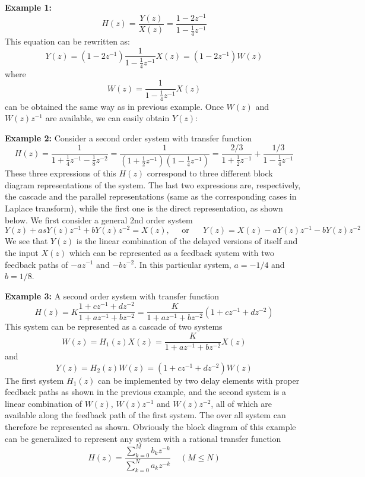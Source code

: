 
{\bf Example 1: } 
\[ H(z)=\frac{Y(z)}{X(z)}=\frac{1-2z^{-1}}{1-\frac{1}{4}z^{-1}} \]
This equation can be rewritten as:
\[ Y(z)=(1-2z^{-1}) \frac{1}{1-\frac{1}{4}z^{-1}}X(z)=(1-2z^{-1})W(z) \]
where 
\[ W(z)=\frac{1}{1-\frac{1}{4}z^{-1}}X(z) \]
can be obtained the same way as in previous example. Once $W(z)$ and
$W(z)z^{-1}$ are available, we can easily obtain $Y(z)$:


{\bf Example 2: } Consider a second order system with transfer function
\[
H(z)=\frac{1}{1+\frac{1}{4}z^{-1}-\frac{1}{8}z^{-2}}
	=\frac{1}{(1+\frac{1}{2}z^{-1})(1-\frac{1}{4}z^{-1})}
	=\frac{2/3}{1+\frac{1}{2}z^{-1}}+\frac{1/3}{1-\frac{1}{4}z^{-1}}
\]
These three expressions of this $H(z)$ correspond to three different block
diagram representations of the system. The last two expressions are, 
respectively, the cascade and the parallel representations (same as the
corresponding cases in Laplace transform), while the first one is the 
direct representation, as shown below. We first consider a general 2nd order
system
\[	Y(z)+asY(z)z^{-1}+bY(z)z^{-2}=X(z),\;\;\;\;\;\mbox{or}\;\;\;\;\;\;
	Y(z)=X(z)-aY(z)z^{-1}-bY(z)z^{-2}	\]
We see that $Y(z)$ is the linear combination of the delayed versions of 
itself and the input $X(z)$ which can be represented as a feedback system with
two feedback paths of $-az^{-1}$ and $-bz^{-2}$. In this particular system,
$a=-1/4$ and $b=1/8$.





{\bf Example 3: } A second order system with transfer function
\[	H(z)=K \frac{1+cz^{-1}+dz^{-2}}{1+az^{-1}+bz^{-2}}
	=\frac{K}{1+az^{-1}+bz^{-2}}(1+cz^{-1}+dz^{-2})
\]
This system can be represented as a cascade of two systems
\[	W(z)=H_1(z)X(z)=\frac{K}{1+az^{-1}+bz^{-2}}X(z)	\]
and 
\[	Y(z)=H_2(z)W(z)=(1+cz^{-1}+dz^{-2})W(z)	\]
The first system $H_1(z)$ can be implemented by two delay elements with proper 
feedback paths as shown in the previous example, and the second system is a 
linear combination of $W(z)$, $W(z)z^{-1}$ and $W(z)z^{-2}$, all of which are
available along the feedback path of the first system. The over all system can
therefore be represented as shown. Obviously the block diagram of this example 
can be generalized to represent any system with a rational transfer function
\[
H(z)=\frac{\sum_{k=0}^M b_k z^{-k}}{\sum_{k=0}^N a_k z^{-k}}\;\;\;\;(M \le N)	
\]

